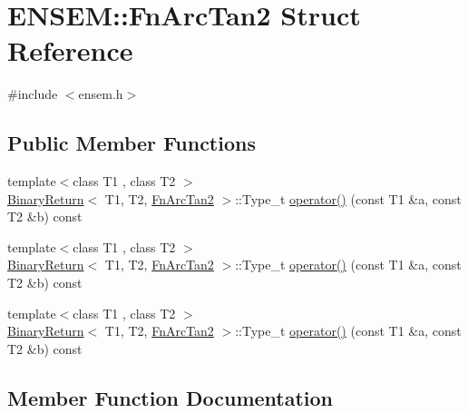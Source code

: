 \hypertarget{structENSEM_1_1FnArcTan2}{}\section{E\+N\+S\+EM\+:\+:Fn\+Arc\+Tan2 Struct Reference}
\label{structENSEM_1_1FnArcTan2}


{\ttfamily \#include $<$ensem.\+h$>$}

\subsection*{Public Member Functions}
\begin{DoxyCompactItemize}
\item 
{\footnotesize template$<$class T1 , class T2 $>$ }\\\mbox{\hyperlink{structENSEM_1_1BinaryReturn}{Binary\+Return}}$<$ T1, T2, \mbox{\hyperlink{structENSEM_1_1FnArcTan2}{Fn\+Arc\+Tan2}} $>$\+::Type\+\_\+t \mbox{\hyperlink{structENSEM_1_1FnArcTan2_a85fa496fe2e31b3576d34560143f5b8f}{operator()}} (const T1 \&a, const T2 \&b) const
\item 
{\footnotesize template$<$class T1 , class T2 $>$ }\\\mbox{\hyperlink{structENSEM_1_1BinaryReturn}{Binary\+Return}}$<$ T1, T2, \mbox{\hyperlink{structENSEM_1_1FnArcTan2}{Fn\+Arc\+Tan2}} $>$\+::Type\+\_\+t \mbox{\hyperlink{structENSEM_1_1FnArcTan2_a85fa496fe2e31b3576d34560143f5b8f}{operator()}} (const T1 \&a, const T2 \&b) const
\item 
{\footnotesize template$<$class T1 , class T2 $>$ }\\\mbox{\hyperlink{structENSEM_1_1BinaryReturn}{Binary\+Return}}$<$ T1, T2, \mbox{\hyperlink{structENSEM_1_1FnArcTan2}{Fn\+Arc\+Tan2}} $>$\+::Type\+\_\+t \mbox{\hyperlink{structENSEM_1_1FnArcTan2_a85fa496fe2e31b3576d34560143f5b8f}{operator()}} (const T1 \&a, const T2 \&b) const
\end{DoxyCompactItemize}


\subsection{Member Function Documentation}
\mbox{\label{structENSEM_1_1FnArcTan2_a85fa496fe2e31b3576d34560143f5b8f}} 
